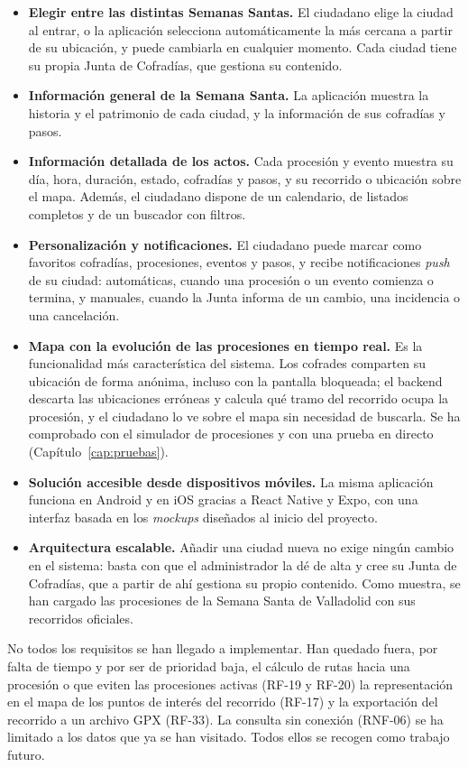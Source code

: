 \begin{itemize}
    \item \textbf{Elegir entre las distintas Semanas Santas.} El ciudadano elige la ciudad al entrar, o la aplicación selecciona automáticamente la más cercana a partir de su ubicación, y puede cambiarla en cualquier momento. Cada ciudad tiene su propia Junta de Cofradías, que gestiona su contenido.
    \item \textbf{Información general de la Semana Santa.} La aplicación muestra la historia y el patrimonio de cada ciudad, y la información de sus cofradías y pasos.
    \item \textbf{Información detallada de los actos.} Cada procesión y evento muestra su día, hora, duración, estado, cofradías y pasos, y su recorrido o ubicación sobre el mapa. Además, el ciudadano dispone de un calendario, de listados completos y de un buscador con filtros.
    \item \textbf{Personalización y notificaciones.} El ciudadano puede marcar como favoritos cofradías, procesiones, eventos y pasos, y recibe notificaciones \emph{push} de su ciudad: automáticas, cuando una procesión o un evento comienza o termina, y manuales, cuando la Junta informa de un cambio, una incidencia o una cancelación.
    \item \textbf{Mapa con la evolución de las procesiones en tiempo real.} Es la funcionalidad más característica del sistema. Los cofrades comparten su ubicación de forma anónima, incluso con la pantalla bloqueada; el backend descarta las ubicaciones erróneas y calcula qué tramo del recorrido ocupa la procesión, y el ciudadano lo ve sobre el mapa sin necesidad de buscarla. Se ha comprobado con el simulador de procesiones y con una prueba en directo (Capítulo~\ref{cap:pruebas}).
    \item \textbf{Solución accesible desde dispositivos móviles.} La misma aplicación funciona en Android y en iOS gracias a React Native y Expo, con una interfaz basada en los \emph{mockups} diseñados al inicio del proyecto.
    \item \textbf{Arquitectura escalable.} Añadir una ciudad nueva no exige ningún cambio en el sistema: basta con que el administrador la dé de alta y cree su Junta de Cofradías, que a partir de ahí gestiona su propio contenido. Como muestra, se han cargado las procesiones de la Semana Santa de Valladolid con sus recorridos oficiales.
\end{itemize}

No todos los requisitos se han llegado a implementar. Han quedado fuera, por falta de tiempo y por ser de prioridad baja, el cálculo de rutas hacia una procesión o que eviten las procesiones activas (RF-19 y RF-20) la representación en el mapa de los puntos de interés del recorrido (RF-17) y la exportación del recorrido a un archivo GPX (RF-33). La consulta sin conexión (RNF-06) se ha limitado a los datos que ya se han visitado. Todos ellos se recogen como trabajo futuro.

